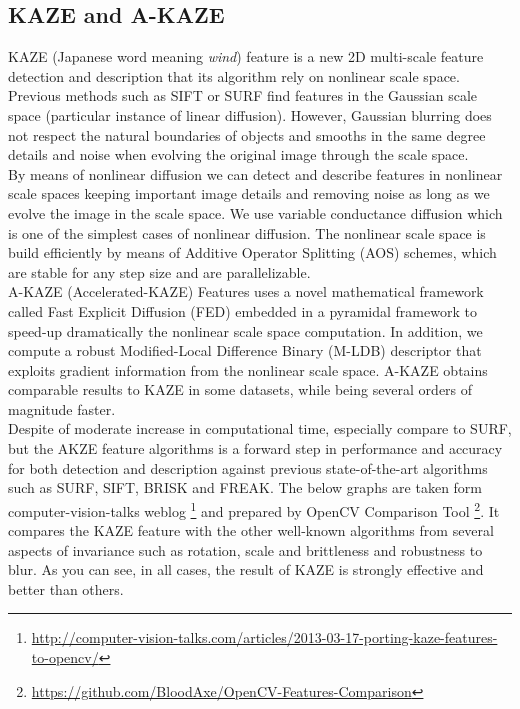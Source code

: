 \subsection {KAZE and A-KAZE}
KAZE (Japanese word meaning \emph{wind}) \cite{alcantarilla2012kaze} feature is a new 2D multi-scale feature detection and description that its algorithm rely on nonlinear scale space. Previous methods such as SIFT or SURF find features in the Gaussian scale space (particular instance of linear diffusion). However, Gaussian blurring does not respect the natural boundaries of objects and smooths in the same degree details and noise when evolving the original image through the scale space.\\
By means of nonlinear diffusion we can detect and describe features in nonlinear scale spaces keeping important image details and removing noise as long as we evolve the image in the scale space. We use variable conductance diffusion which is one of the simplest cases of nonlinear diffusion. The nonlinear scale space is build efficiently by means of Additive Operator Splitting (AOS) schemes, which are stable for any step size and are parallelizable.\\
A-KAZE (Accelerated-KAZE) \cite{alcantarilla2011fast} Features uses a novel mathematical framework called Fast Explicit Diffusion (FED) embedded in a pyramidal framework to speed-up dramatically the nonlinear scale space computation. In addition, we compute a robust Modified-Local Difference Binary (M-LDB) descriptor that exploits gradient information from the nonlinear scale space. A-KAZE obtains comparable results to KAZE in some datasets, while being several orders of magnitude faster.\\
Despite of moderate increase in computational time, especially compare to SURF, but the AKZE feature algorithms is a forward step in performance and accuracy for both detection and description against previous state-of-the-art algorithms such as SURF, SIFT, BRISK and FREAK.
The below graphs are taken form computer-vision-talks weblog \footnote{\url{http://computer-vision-talks.com/articles/2013-03-17-porting-kaze-features-to-opencv/}} and prepared by OpenCV Comparison Tool \footnote{\url{https://github.com/BloodAxe/OpenCV-Features-Comparison}}. It compares the KAZE feature with the other well-known algorithms from several aspects of invariance such as rotation, scale and brittleness and robustness to blur. As you can see, in all cases, the result of KAZE is strongly effective and better than others. 

